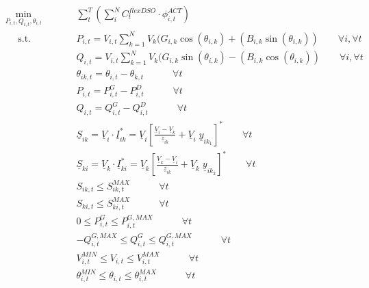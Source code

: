 \begin{subequations}
\begin{alignat}{2}
&\!\min_{P_{i,t}, Q_{i,t}, \theta_{i,t}}  &\qquad& \sum_{t}^{T} \left( \sum_{i}^{N} C_t^{flexDSO} \cdot \phi_{i,t}^{ACT} \right) \label{eq:optProb}\\ 
&\phantom{Mi} \text{s.t.} &      & P_{i,t} = V_{i,t} \sum_{k=1}^{N} V_{k} (G_{i,k} \cos(\theta_{i,k}) + (B_{i,k} \sin(\theta_{i,k})) \qquad \forall i,\forall t \label{eq:activepowernodalbalance} \\ 
&				   &      & Q_{i,t} = V_{i,t} \sum_{k=1}^{N} V_{k} (G_{i,k} \sin(\theta_{i,k}) - (B_{i,k} \cos(\theta_{i,k})) \qquad \forall i,\forall t \label{eq:reactivepowernodalbalance} \\
&                  &      & \theta_{ik,t} = \theta_{i,t} - \theta_{k,t} \quad   \qquad  \forall t  \label{eq:voltageangle} \\
&                  &      & P_{i,t} = P_{i,t}^{G} - P_{i,t}^{D}  \quad   \qquad  \forall t  \label{eq:Pi} \\
&                  &      & Q_{i,t} = Q_{i,t}^{G} - Q_{i,t}^{D}  \quad   \qquad  \forall t  \label{eq:Qi} \\
&                  &      & \underline{S}_{ik} = \underline{V}_{i} \cdot \underline{I}_{ik}^{*} = \underline{V}_{i} \left[ \frac{\underline{V}_{i} - \underline{V}_{k}}{\underline{z}_{ik}} + \underline{V}_{i} \; \underline{y}_{ik_1} \right]^{*}   \qquad  \forall t  \label{eq:apparentflowlineik} \\
&                  &      & \underline{S}_{ki} = \underline{V}_{k} \cdot \underline{I}_{ki}^{*} = \underline{V}_{k} \left[ \frac{\underline{V}_{k} - \underline{V}_{i}}{\underline{z}_{ik}} + \underline{V}_{k} \;  \underline{y}_{ik_2} \right]^{*}   \qquad  \forall t  \label{eq:apparentflowlineki} \\
&                  &      &  S_{ik,t} \leq S_{ik,t}^{MAX}  \quad   \qquad  \forall t  \label{eq:Siklimit} \\
&                  &      &  S_{ki,t} \leq S_{ki,t}^{MAX}  \quad   \qquad  \forall t  \label{eq:Skilimit} \\ 
&                  &      &  0 \leq P_{i,t}^{G} \leq P_{i,t}^{G,MAX}  \quad   \qquad  \forall t  \label{eq:genactivepower} \\
&                  &      &  - Q_{i,t}^{G,MAX} \leq Q_{i,t}^{G} \leq Q_{i,t}^{G,MAX}  \quad   \qquad  \forall t \label{eq:genreactivepower} \\
&                  &      &  V_{i,t}^{MIN} \leq V_{i,t} \leq V_{i,t}^{MAX}  \quad   \qquad  \forall t \label{eq:voltagelimit} \\
&                  &      & \theta_{i,t}^{MIN} \leq \theta_{i,t}  \leq \theta_{i,t}^{MAX} \quad   \qquad  \forall t  \label{eq:voltageangle}
\end{alignat}
\end{subequations}

